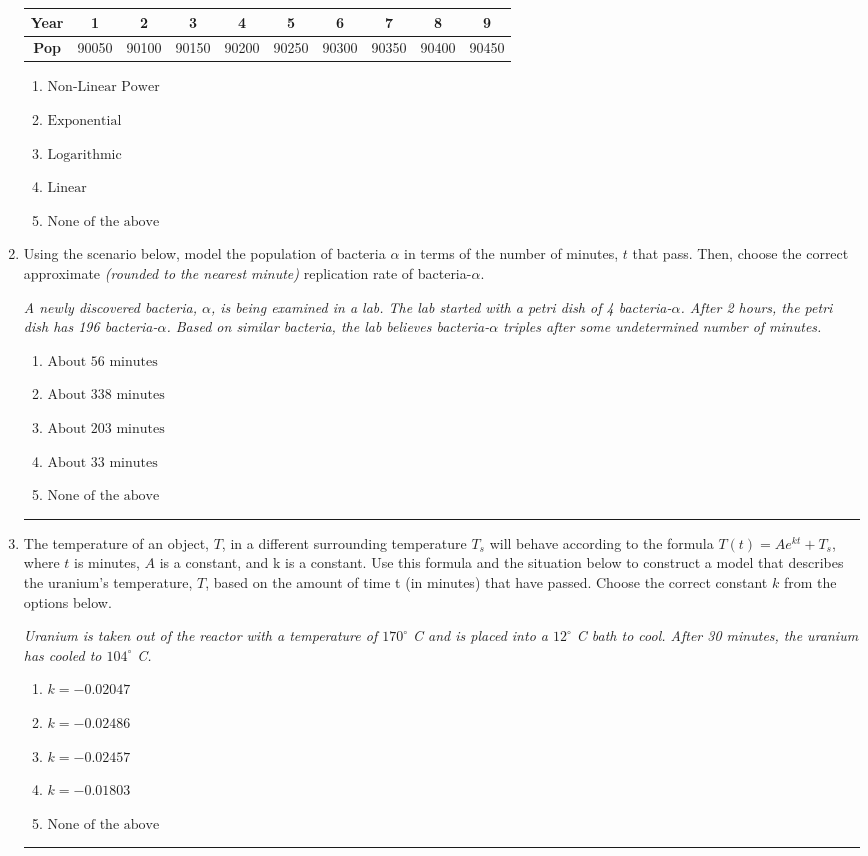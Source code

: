 \documentclass[14pt]{extbook}
\newcommand{\litem}[1]{\item#1\hspace*{-1cm}\rule{\textwidth}{0.4pt}}
\begin{document}
\begin{enumerate}
{\begin{tabular}{c|c|c|c|c|c|c|c|c|c}
\textbf{Year} &1 &2 &3 &4 &5 &6 &7 &8 &9\tabularnewline \hline
\textbf{Pop} &90050 &90100 &90150 &90200 &90250 &90300 &90350 &90400 &90450\end{tabular}\begin{enumerate}[label=\Alph*.]
\item \( \text{Non-Linear Power} \)
\item \( \text{Exponential} \)
\item \( \text{Logarithmic} \)
\item \( \text{Linear} \)
\item \( \text{None of the above} \)

\end{enumerate} }
\litem{
Using the scenario below, model the population of bacteria $\alpha$ in terms of the number of minutes, $t$ that pass. Then, choose the correct approximate \textit{(rounded to the nearest minute)} replication rate of bacteria-$\alpha$.
\begin{center}
    \textit{ A newly discovered bacteria, $\alpha$, is being examined in a lab. The lab started with a petri dish of 4 bacteria-$\alpha$. After 2 hours, the petri dish has 196 bacteria-$\alpha$. Based on similar bacteria, the lab believes bacteria-$\alpha$ triples after some undetermined number of minutes. }
\end{center}
\begin{enumerate}[label=\Alph*.]
\item \( \text{About } 56 \text{ minutes} \)
\item \( \text{About } 338 \text{ minutes} \)
\item \( \text{About } 203 \text{ minutes} \)
\item \( \text{About } 33 \text{ minutes} \)
\item \( \text{None of the above} \)

\end{enumerate} }
\litem{
The temperature of an object, $T$, in a different surrounding temperature $T_s$ will behave according to the formula $T(t) = Ae^{kt} + T_s$, where $t$ is minutes, $A$ is a constant, and k is a constant. Use this formula and the situation below to construct a model that describes the uranium's temperature, $T$, based on the amount of time t (in minutes) that have passed. Choose the correct constant $k$ from the options below.
\begin{center}
    \textit{ Uranium is taken out of the reactor with a temperature of $170^{\circ}$ C and is placed into a $12^{\circ}$ C bath to cool. After 30 minutes, the uranium has cooled to $104^{\circ}$ C. }
\end{center}
\begin{enumerate}[label=\Alph*.]
\item \( k = -0.02047 \)
\item \( k = -0.02486 \)
\item \( k = -0.02457 \)
\item \( k = -0.01803 \)
\item \( \text{None of the above} \)


\end{enumerate}}
\end{enumerate}
\end{document}
